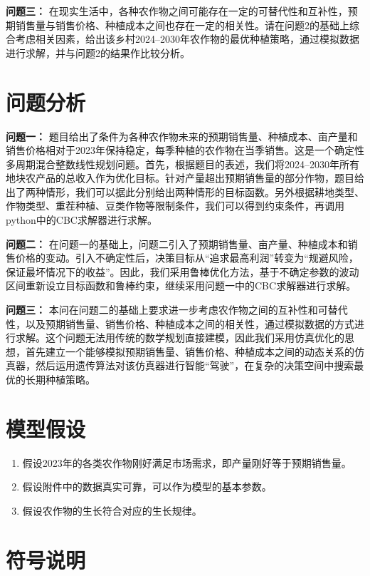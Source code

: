 \documentclass[withoutpreface,bwprint]{cumcmthesis} %
\begin{document}
\textbf{问题三：} 在现实生活中，各种农作物之间可能存在一定的可替代性和互补性，预期销售量与销售价格、种植成本之间也存在一定的相关性。请在问题2的基础上综合考虑相关因素，给出该乡村2024--2030年农作物的最优种植策略，通过模拟数据进行求解，并与问题2的结果作比较分析。


\section{问题分析}


\textbf{问题一：} 题目给出了条件为各种农作物未来的预期销售量、种植成本、亩产量和销售价格相对于2023年保持稳定，每季种植的农作物在当季销售。这是一个确定性多周期混合整数线性规划问题。首先，根据题目的表述，我们将2024--2030年所有地块农产品的总收入作为优化目标。针对产量超出预期销售量的部分作物，题目给出了两种情形，我们可以据此分别给出两种情形的目标函数。另外根据耕地类型、作物类型、重茬种植、豆类作物等限制条件，我们可以得到约束条件，再调用python中的CBC求解器进行求解。

\textbf{问题二：} 在问题一的基础上，问题二引入了预期销售量、亩产量、种植成本和销售价格的变动。引入不确定性后，决策目标从“追求最高利润”转变为“规避风险，保证最坏情况下的收益”。因此，我们采用鲁棒优化方法，基于不确定参数的波动区间重新设立目标函数和鲁棒约束，继续采用问题一中的CBC求解器进行求解。

\textbf{问题三：} 本问在问题二的基础上要求进一步考虑农作物之间的互补性和可替代性，以及预期销售量、销售价格、种植成本之间的相关性，通过模拟数据的方式进行求解。这个问题无法用传统的数学规划直接建模，因此我们采用仿真优化的思想，首先建立一个能够模拟预期销售量、销售价格、种植成本之间的动态关系的仿真器，然后运用遗传算法对该仿真器进行智能“驾驶”，在复杂的决策空间中搜索最优的长期种植策略。


\section{模型假设}

\begin{enumerate}
	\item 假设2023年的各类农作物刚好满足市场需求，即产量刚好等于预期销售量。
	\item 假设附件中的数据真实可靠，可以作为模型的基本参数。
	\item 假设农作物的生长符合对应的生长规律。
\end{enumerate}

\section{符号说明}
\end{document}
